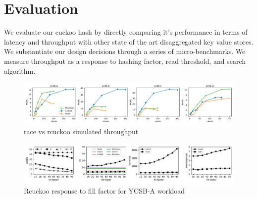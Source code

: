 \section{Evaluation}
\label{sec:eval}

We evaluate our cuckoo hash by directly comparing it's
performance in terms of latency and throughput with other
state of the art disaggregated key value stores. We
substantiate our design decisions through a series of
micro-benchmarks. We measure throughput as a response to
hashing factor, read threshold, and search algorithm.

\begin{figure}[ht]
    \includegraphics[width=0.99\linewidth]{fig/hero_ycsb_throughput.pdf}
    \caption{race vs rcuckoo simulated throughput }
    \label{fig:ycsb_throughput}
\end{figure}

\begin{figure}[ht]
    \includegraphics[width=0.99\linewidth]{fig/hero_ycsb_fill.pdf}
    \caption{Rcuckoo response to fill factor for YCSB-A workload}
    \label{fig:ycsb_fill_latency}
\end{figure}


